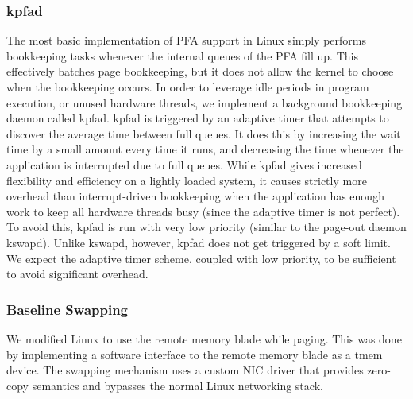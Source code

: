 \subsubsection{kpfad} \label{sec:kpfad}
The most basic implementation of PFA support in Linux simply performs
bookkeeping tasks whenever the internal queues of the PFA fill up. This
effectively batches page bookkeeping, but it does not allow the kernel to
choose when the bookkeeping occurs. In order to leverage idle periods in
program execution, or unused hardware threads, we implement a background
bookkeeping daemon called \gls{kpfad}. \Gls{kpfad} is triggered by an adaptive
timer that attempts to discover the average time between full queues. It does
this by increasing the wait time by a small amount every time it runs, and
decreasing the time whenever the application is interrupted due to full queues. 
While \gls{kpfad} gives increased flexibility and efficiency on a lightly
loaded system, it causes strictly more overhead than interrupt-driven
bookkeeping when the application has enough work to keep all hardware threads
busy (since the adaptive timer is not perfect). To avoid this, \gls{kpfad} is run
with very low priority (similar to the page-out daemon \gls{kswapd}). Unlike
\gls{kswapd}, however, \gls{kpfad} does not get triggered by a soft limit. We expect
the adaptive timer scheme, coupled with low priority, to be sufficient to avoid
significant overhead.

\subsubsection{Baseline Swapping}
We modified Linux to use the remote memory blade while paging. This was done by
implementing a software interface to the remote memory blade as a \gls{tmem}
device. The swapping mechanism uses a custom NIC driver that provides zero-copy
semantics and bypasses the normal Linux networking stack. 

